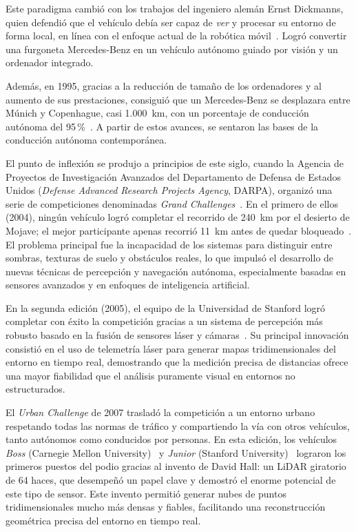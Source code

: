 Este paradigma cambió con los trabajos del ingeniero alemán Ernst
Dickmanns, quien defendió que el vehículo debía ser capaz de \emph{ver}
y procesar su entorno de forma local, en línea con el enfoque actual de
la robótica móvil~\cite{quintessence_dickmanns}. Logró convertir una
furgoneta Mercedes-Benz en un vehículo autónomo guiado por visión y un
ordenador integrado.

Además, en 1995, gracias a la reducción de tamaño de los ordenadores y
al aumento de sus prestaciones, consiguió que un Mercedes-Benz se
desplazara entre Múnich y Copenhague, casi 1.000~km, con un porcentaje
de conducción autónoma del 95\,\%~\cite{xataka_tecnologia}. A partir de
estos avances, se sentaron las bases de la conducción autónoma
contemporánea.

El punto de inflexión se produjo a principios de este siglo, cuando la
Agencia de Proyectos de Investigación Avanzados del Departamento de
Defensa de Estados Unidos (\textit{Defense Advanced Research Projects
Agency}, DARPA), organizó una serie de competiciones denominadas
\textit{Grand Challenges}~\cite{iptc_vehiculo}. En el primero de ellos
(2004), ningún vehículo logró completar el recorrido de 240~km por el
desierto de Mojave; el mejor participante apenas recorrió 11~km antes
de quedar bloqueado~\cite{elmundo_carrera}. El problema principal fue
la incapacidad de los sistemas para distinguir entre sombras, texturas
de suelo y obstáculos reales, lo que impulsó el desarrollo de nuevas
técnicas de percepción y navegación autónoma, especialmente basadas en
sensores avanzados y en enfoques de inteligencia artificial.

En la segunda edición (2005), el equipo de la Universidad de Stanford
logró completar con éxito la competición gracias a un sistema de
percepción más robusto basado en la fusión de sensores láser y
cámaras~\cite{thrun2006stanley}. Su principal innovación consistió en
el uso de telemetría láser para generar mapas tridimensionales del
entorno en tiempo real, demostrando que la medición precisa de
distancias ofrece una mayor fiabilidad que el análisis puramente visual
en entornos no estructurados.

El \textit{Urban Challenge} de 2007 trasladó la competición a un
entorno urbano respetando todas las normas de tráfico y compartiendo la
vía con otros vehículos, tanto autónomos como conducidos por personas.
En esta edición, los vehículos \textit{Boss} (Carnegie Mellon
University)~\cite{urmson2008boss} y \textit{Junior} (Stanford
University)~\cite{petrovskaya2009model} lograron los primeros puestos
del podio gracias al invento de David Hall: un LiDAR giratorio de 64
haces, que desempeñó un papel clave y demostró el enorme potencial de
este tipo de sensor. Este invento permitió generar nubes de puntos
tridimensionales mucho más densas y fiables, facilitando una
reconstrucción geométrica precisa del entorno en tiempo real.

